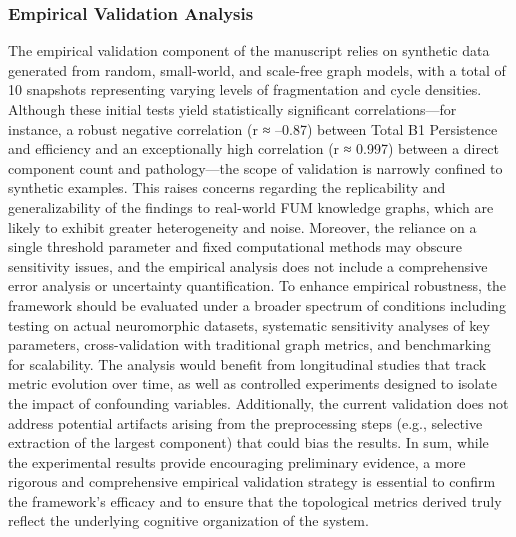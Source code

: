 \documentclass[12pt]{article}
\begin{document}
\subsubsection{Empirical Validation Analysis  }
The empirical validation component of the manuscript relies on synthetic data generated from random, small-world, and scale-free graph models, with a total of 10 snapshots representing varying levels of fragmentation and cycle densities. Although these initial tests yield statistically significant correlations—for instance, a robust negative correlation (r ≈ –0.87) between Total B1 Persistence and efficiency and an exceptionally high correlation (r ≈ 0.997) between a direct component count and pathology—the scope of validation is narrowly confined to synthetic examples. This raises concerns regarding the replicability and generalizability of the findings to real-world FUM knowledge graphs, which are likely to exhibit greater heterogeneity and noise. Moreover, the reliance on a single threshold parameter and fixed computational methods may obscure sensitivity issues, and the empirical analysis does not include a comprehensive error analysis or uncertainty quantification. To enhance empirical robustness, the framework should be evaluated under a broader spectrum of conditions including testing on actual neuromorphic datasets, systematic sensitivity analyses of key parameters, cross-validation with traditional graph metrics, and benchmarking for scalability. The analysis would benefit from longitudinal studies that track metric evolution over time, as well as controlled experiments designed to isolate the impact of confounding variables. Additionally, the current validation does not address potential artifacts arising from the preprocessing steps (e.g., selective extraction of the largest component) that could bias the results. In sum, while the experimental results provide encouraging preliminary evidence, a more rigorous and comprehensive empirical validation strategy is essential to confirm the framework’s efficacy and to ensure that the topological metrics derived truly reflect the underlying cognitive organization of the system.
\end{document}
